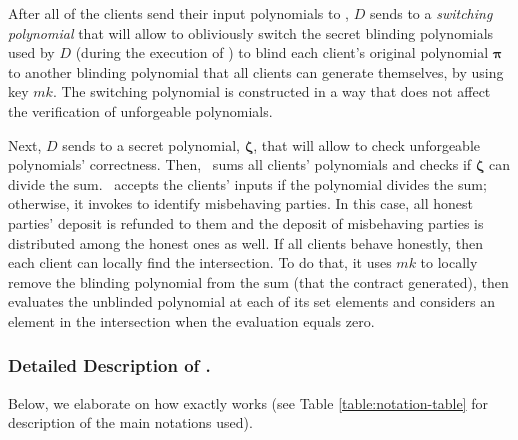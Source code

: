 After all of the clients send their input polynomials to \scf, $D$ sends to \scf a \emph{switching polynomial} that will allow \scf to obliviously switch the secret blinding polynomials used by $D$ (during the execution of \vopr) to blind each client's original polynomial $\bm\pi$  to another blinding polynomial that all clients can generate themselves, by using key $mk$.  The switching polynomial is constructed in a way that does not affect the verification of unforgeable polynomials. 




Next, $D$ sends to \scf a secret polynomial, $\bm\zeta$, that will allow \scf to check unforgeable polynomials' correctness. Then, \scf\ sums all clients' polynomials and checks if $\bm\zeta$ can divide the sum. \scf\ accepts the clients' inputs if the polynomial divides the sum; otherwise, it invokes \aud to identify misbehaving parties.  In this case, all honest parties' deposit is refunded to them and the deposit of misbehaving parties is distributed among the honest ones as well. If all clients behave honestly,  then each client can locally find the intersection. To do that, it uses $mk$ to locally remove the blinding polynomial from the sum (that the contract generated), then evaluates the unblinded polynomial at each of its set elements and considers an element in the intersection when the evaluation equals zero.



\subsubsection{Detailed Description of \fpsi.} Below, we elaborate on how \fpsi exactly works (see Table \ref{table:notation-table} for description of the main notations used). 

